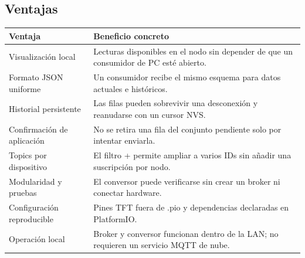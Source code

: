 \documentclass[11pt,a4paper]{article}
\begin{document}
\subsection{Ventajas}
\begin{table}[h!]
\small
\begin{tabularx}{\linewidth}{@{}P{40mm}Y@{}}
\toprule
\textbf{Ventaja} & \textbf{Beneficio concreto}\\\midrule
Visualización local & Lecturas disponibles en el nodo sin depender de que un consumidor de PC esté abierto.\\
Formato JSON uniforme & Un consumidor recibe el mismo esquema para datos actuales e históricos.\\
Historial persistente & Las filas pueden sobrevivir una desconexión y reanudarse con un cursor NVS.\\
Confirmación de aplicación & No se retira una fila del conjunto pendiente solo por intentar enviarla.\\
Topics por dispositivo & El filtro + permite ampliar a varios IDs sin añadir una suscripción por nodo.\\
Modularidad y pruebas & El conversor puede verificarse sin crear un broker ni conectar hardware.\\
Configuración reproducible & Pines TFT fuera de .pio y dependencias declaradas en PlatformIO.\\
Operación local & Broker y conversor funcionan dentro de la LAN; no requieren un servicio MQTT de nube.\\
\bottomrule
\end{tabularx}
\end{table}
\end{document}
